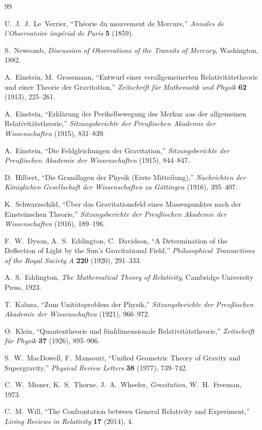 \documentclass[11pt,a4paper]{article}
\theoremstyle{definition}
\theoremstyle{remark}
\begin{document}
\begin{thebibliography}{99}

U.~J.~J.~Le~Verrier,
\enquote{Théorie du mouvement de Mercure,}
\textit{Annales de l'Observatoire impérial de Paris} \textbf{5} (1859).

S.~Newcomb,
\textit{Discussion of Observations of the Transits of Mercury},
Washington, 1882.

A.~Einstein, M.~Grossmann,
\enquote{Entwurf einer verallgemeinerten Relativitätstheorie und einer Theorie der Gravitation,}
\textit{Zeitschrift für Mathematik und Physik} \textbf{62} (1913), 225--261.

A.~Einstein,
\enquote{Erklärung der Perihelbewegung des Merkur aus der allgemeinen Relativitätstheorie,}
\textit{Sitzungsberichte der Preußischen Akademie der Wissenschaften} (1915), 831--839.

A.~Einstein,
\enquote{Die Feldgleichungen der Gravitation,}
\textit{Sitzungsberichte der Preußischen Akademie der Wissenschaften} (1915), 844--847.

D.~Hilbert,
\enquote{Die Grundlagen der Physik (Erste Mitteilung),}
\textit{Nachrichten der Königlichen Gesellschaft der Wissenschaften zu Göttingen} (1916), 395--407.

K.~Schwarzschild,
\enquote{Über das Gravitationsfeld eines Massenpunktes nach der Einsteinschen Theorie,}
\textit{Sitzungsberichte der Preußischen Akademie der Wissenschaften} (1916), 189--196.

F.~W.~Dyson, A.~S.~Eddington, C.~Davidson,
\enquote{A Determination of the Deflection of Light by the Sun's Gravitational Field,}
\textit{Philosophical Transactions of the Royal Society A} \textbf{220} (1920), 291--333.

A.~S.~Eddington,
\textit{The Mathematical Theory of Relativity},
Cambridge University Press, 1923.

T.~Kaluza,
\enquote{Zum Unitätsproblem der Physik,}
\textit{Sitzungsberichte der Preußischen Akademie der Wissenschaften} (1921), 966--972.

O.~Klein,
\enquote{Quantentheorie und fünfdimensionale Relativitätstheorie,}
\textit{Zeitschrift für Physik} \textbf{37} (1926), 895--906.

S.~W.~MacDowell, F.~Mansouri,
\enquote{Unified Geometric Theory of Gravity and Supergravity,}
\textit{Physical Review Letters} \textbf{38} (1977), 739--742.

C.~W.~Misner, K.~S.~Thorne, J.~A.~Wheeler,
\textit{Gravitation},
W.~H.~Freeman, 1973.

C.~M.~Will,
\enquote{The Confrontation between General Relativity and Experiment,}
\textit{Living Reviews in Relativity} \textbf{17} (2014), 4.

\end{thebibliography}
\end{document}
